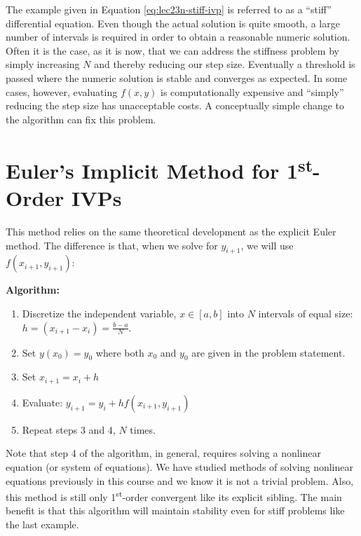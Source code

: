 The example given in Equation \ref{eq:lec23n-stiff-ivp} is referred to as a ``stiff'' differential equation.  Even though the actual solution is quite smooth, a large number of intervals is required in order to obtain a reasonable numeric solution.  Often it is the case, as it is now, that we can address the stiffness problem by simply increasing $N$ and thereby reducing our step size.  Eventually a threshold is passed where the numeric solution is stable and converges as expected.  In some cases, however, evaluating $f(x,y)$ is computationally expensive and ``simply'' reducing the step size has unacceptable costs.  A conceptually simple change to the algorithm can fix this problem.

\section{Euler's Implicit Method for 1\textsuperscript{st}-Order IVPs}
This method relies on the same theoretical development as the explicit Euler method.  The difference is that, when we solve for $y_{i+1}$, we will use $f(x_{i+1},y_{i+1})$:

\vspace{0.2cm}

\noindent\textbf{Algorithm:}
\begin{enumerate}
\item Discretize the independent variable, $x \in [a,b]$ into $N$ intervals of equal size: $h = (x_{i+1}-x_i) = \frac{b-a}{N}$.
\item Set $y(x_0) = y_0$ where both $x_0$ and $y_0$ are given in the problem statement.
\item Set $x_{i+1} = x_i + h$
\item Evaluate: $y_{i+1} = y_i + hf(x_{i+1},y_{i+1})$
\item Repeat steps 3 and 4, $N$ times.
\end{enumerate}
Note that step 4 of the algorithm, in general, requires solving a nonlinear equation (or system of equations).  We have studied methods of solving nonlinear equations previously in this course and we know it is not a trivial problem.  Also, this method is still only 1\textsuperscript{st}-order convergent like its explicit sibling.  The main benefit is that this algorithm will maintain stability even for stiff problems like the last example.

